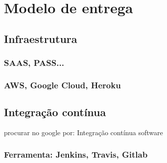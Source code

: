 \chapter{Modelo de entrega}

\section{Infraestrutura}

\subsection{SAAS, PASS...}

\subsection{AWS, Google Cloud, Heroku}

\section{Integração contínua}

procurar no google por: Integração contínua software

\subsection{Ferramenta: Jenkins, Travis, Gitlab}
